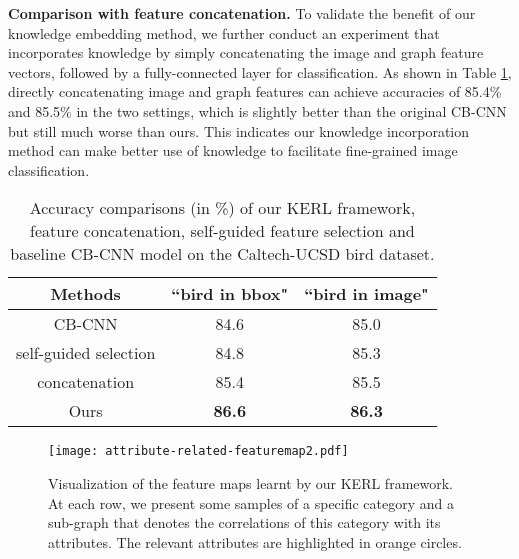\documentclass{article}
\begin{document}
\noindent\textbf{Comparison with feature concatenation. }To validate the benefit of our knowledge embedding method, we further conduct an experiment that incorporates knowledge by simply concatenating the image and graph feature vectors, followed by a fully-connected layer for classification. As shown in Table \ref{table:cub-knowledge}, directly concatenating image and graph features can achieve accuracies of 85.4\% and 85.5\% in the two settings, which is slightly better than the original CB-CNN but still much worse than ours. This indicates our knowledge incorporation method can make better use of knowledge to facilitate fine-grained image classification.

\begin{table}[htbp]
\centering
\begin{tabular}{c|c|c}
\hline
\centering  Methods  & ``bird in bbox" & ``bird in image"  \\
\hline
\hline
CB-CNN & 84.6 & 85.0 \\
self-guided selection & 84.8 & 85.3\\
concatenation & 85.4& 85.5\\
Ours & \textbf{86.6} & \textbf{86.3} \\
\hline
\end{tabular}
\vspace{-6pt}
\caption{Accuracy comparisons (in \%) of our KERL framework, feature concatenation, self-guided feature selection and baseline CB-CNN model on the Caltech-UCSD bird dataset.}
\vspace{-6pt}
\label{table:cub-knowledge}
\end{table}

\begin{figure}[!t]
   \centering
   \texttt{[image: attribute-related-featuremap2.pdf]} %
   \vspace{-6pt}
   \caption{Visualization of the feature maps learnt by our KERL framework. At each row, we present some samples of a specific category and a sub-graph that denotes the correlations of this category with its attributes. The relevant attributes are highlighted in orange circles.}
   \vspace{-6pt}
   \label{fig:visualization2}
\end{figure}
\end{document}
